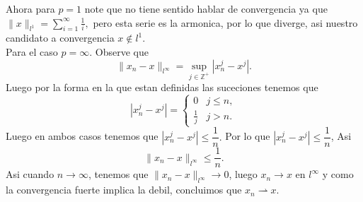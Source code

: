 \begin{itemize}
\begin{sproof}
    Ahora para $p=1$ note que no tiene sentido hablar de convergencia ya que $\|x\|_{l^1}=\sum_{i=1}^\infty\frac{1}{i},$ pero esta serie es la armonica, por lo que diverge, asi nuestro candidato a convergencia $x\notin l^1.$\\

    Para el caso $p=\infty.$ Observe que 
    $$\|x_n-x\|_{l^\infty}=\sup_{j\in\mathbb{Z}^+}|x_n^j-x^j|.$$
    Luego por la forma en la que estan definidas las suceciones tenemos que
    $$|x_n^j-x^j|=\begin{cases}
      0& j\leq n,\\
      \frac{1}{j} & j>n.
    \end{cases}$$
    Luego en ambos casos tenemos que $|x_n^j-x^j|\leq \dfrac{1}{n}.$ Por lo que $|x_n^j-x^j|\leq \dfrac{1}{n}$, Asi
    $$\|x_n-x\|_{l^\infty}\leq \frac{1}{n}.$$
    Asi cuando $n\to \infty$, tenemos que $\|x_n-x\|_{l^\infty}\to 0$, luego $x_n\to x$ en $l^\infty$ y como la convergencia fuerte implica la debil, concluimos que $x_n \rightharpoonup x.$

    
  \end{sproof}
\end{itemize}



